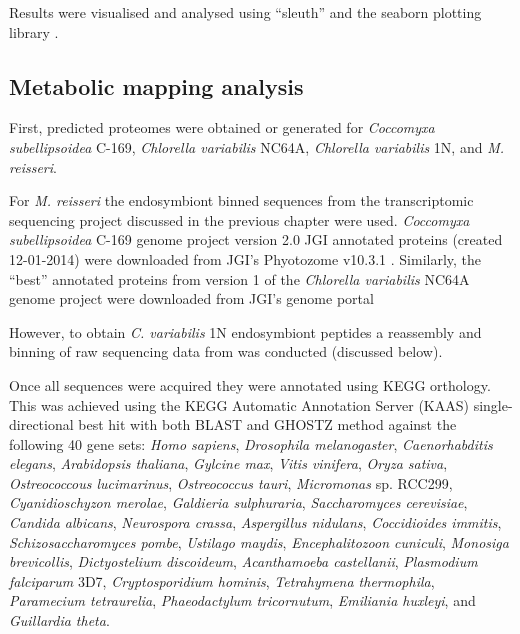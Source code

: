 Results were visualised and analysed using ``sleuth'' and the
seaborn plotting library \citep{michael_waskom_2015_19108}.

\subsection{Metabolic mapping analysis}

First, predicted proteomes were obtained or generated for
\textit{Coccomyxa subellipsoidea} C-169, \textit{Chlorella variabilis}
NC64A, \textit{Chlorella variabilis} 1N, and \textit{M. reisseri}. 

For \textit{M. reisseri} the endosymbiont binned sequences from the transcriptomic
sequencing project discussed in the previous chapter were used. 
\textit{Coccomyxa subellipsoidea} C-169 genome project \citep{Blanc2012} version 2.0 
JGI annotated proteins (created 12-01-2014) were downloaded from JGI's
Phyotozome v10.3.1 \citep{Goodstein2012}. 
Similarly, the ``best'' annotated proteins from
version 1 of the \textit{Chlorella variabilis} NC64A genome project \citep{Blanc2010}
were downloaded from JGI's genome portal \citep{Grigoriev2011,Nordberg2014}

However, to obtain \textit{C. variabilis} 1N endosymbiont peptides 
a reassembly and binning of raw sequencing data from \citep{Kodama2014}
was conducted (discussed below). 

Once all sequences were acquired they were annotated using KEGG
orthology.  This was achieved 
using the KEGG Automatic Annotation Server (KAAS) \citep{Moriya2007a}
single-directional best hit with both BLAST and GHOSTZ \citep{Suzuki2014,Suzuki2015} 
method against the following 40 gene sets: \textit{Homo sapiens}, 
\textit{Drosophila melanogaster}, \textit{Caenorhabditis elegans},
\textit{Arabidopsis thaliana}, \textit{Gylcine max},
\textit{Vitis vinifera}, \textit{Oryza sativa}, 
\textit{Ostreococcous lucimarinus}, \textit{Ostreococcus tauri},
\textit{Micromonas} sp. RCC299, \textit{Cyanidioschyzon merolae},
\textit{Galdieria sulphuraria}, \textit{Saccharomyces cerevisiae},
\textit{Candida albicans}, \textit{Neurospora crassa}, \textit{Aspergillus nidulans},
\textit{Coccidioides immitis}, \textit{Schizosaccharomyces pombe},
\textit{Ustilago maydis}, \textit{Encephalitozoon cuniculi},
\textit{Monosiga brevicollis}, \textit{Dictyostelium discoideum}, 
\textit{Acanthamoeba castellanii}, \textit{Plasmodium falciparum} 3D7, 
\textit{Cryptosporidium hominis}, \textit{Tetrahymena thermophila},
\textit{Paramecium tetraurelia}, \textit{Phaeodactylum tricornutum},
\textit{Emiliania huxleyi}, and \textit{Guillardia theta}.

